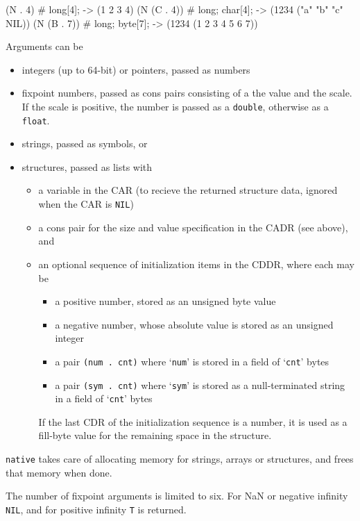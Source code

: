 \begin{wideverbatim}
(N . 4)        # long[4];           -> (1 2 3 4)
(N (C . 4))    # {long; char[4];}   -> (1234 ("a" "b" "c" NIL))
(N (B . 7))    # {long; byte[7];}   -> (1234 (1 2 3 4 5 6 7))
\end{wideverbatim}

Arguments can be

\begin{itemize}
\item integers (up to 64-bit) or pointers, passed as numbers
\item fixpoint numbers, passed as cons pairs consisting of a the value and
   the scale. If the scale is positive, the number is passed as a
   \texttt{double}, otherwise as a \texttt{float}.
\item strings, passed as symbols, or
\item structures, passed as lists with
\begin{itemize}
\item a variable in the CAR (to recieve the returned structure data,
      ignored when the CAR is \texttt{NIL})
\item a cons pair for the size and value specification in the CADR (see
      above), and
\item an optional sequence of initialization items in the CDDR, where
      each may be
\begin{itemize}
\item a positive number, stored as an unsigned byte value
\item a negative number, whose absolute value is stored as an
         unsigned integer
\item a pair \texttt{(num . cnt)} where `\texttt{num}' is stored in a field of
         `\texttt{cnt}' bytes
\item a pair \texttt{(sym . cnt)} where `\texttt{sym}' is stored as a
         null-terminated string in a field of `\texttt{cnt}' bytes
\end{itemize}
If the last CDR of the initialization sequence is a number, it is
      used as a fill-byte value for the remaining space in the
      structure.
\end{itemize}
\end{itemize}

\texttt{native} takes care of allocating memory for strings, arrays or
structures, and frees that memory when done.

The number of fixpoint arguments is limited to six. For NaN or negative
infinity \texttt{NIL}, and for positive infinity \texttt{T} is returned.


